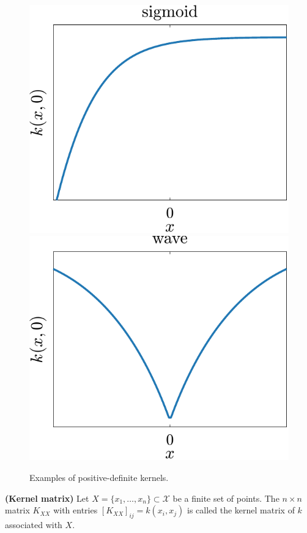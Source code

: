 \begin{figure}[t]
    \includegraphics[scale=0.4]{../images/chap2_kernel_sg.pdf} \hspace{3pt}
    \includegraphics[scale=0.4]{../images/chap2_kernel_wv.pdf} 
	\caption{Examples of positive-definite kernels.}
	\label{fig.pd_kernels}
\end{figure}

\begin{definition}
	\textbf{(Kernel matrix)} Let $X = \{x_1,\dots,x_n\} \subset \mathcal{X}$ be a finite set of points. The $n \times n$ matrix $K_{XX}$ with entries $[K_{XX}]_{ij} = k(x_i,x_j)$ is called the kernel matrix of $k$ associated with $X$.
\end{definition}



